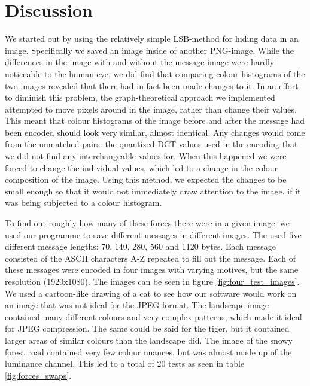 \section{Discussion}
We started out by using the relatively simple LSB-method for hiding data in an image.
Specifically we saved an image inside of another PNG-image.
While the differences in the image with and without the message-image were hardly noticeable to the human eye, we did find that comparing colour histograms of the two images revealed that there had in fact been made changes to it.
In an effort to diminish this problem, the graph-theoretical approach we implemented attempted to move pixels around in the image, rather than change their values.
This meant that colour histograms of the image before and after the message had been encoded should look very similar, almost identical.
Any changes would come from the unmatched pairs: the quantized DCT values used in the encoding that we did not find any interchangeable values for.
When this happened we were forced to change the individual values, which led to a change in the colour composition of the image.
Using this method, we expected the changes to be small enough so that it would not immediately draw attention to the image, if it was being subjected to a colour histogram.

To find out roughly how many of these forces there were in a given image, we used our programme to save different messages in different images.
The used five different message lengths: 70, 140, 280, 560 and 1120 bytes.
Each message consisted of the ASCII characters A-Z repeated to fill out the message.
Each of these messages were encoded in four images with varying motives, but the same resolution (1920x1080).
The images can be seen in figure \ref{fig:four_test_images}.
We used a cartoon-like drawing of a cat to see how our software would work on an image that was not ideal for the JPEG format.
The landscape image contained many different colours and very complex patterns, which made it ideal for JPEG compression.
The same could be said for the tiger, but it contained larger areas of similar colours than the landscape did.
The image of the snowy forest road contained very few colour nuances, but was almost made up of the luminance channel.
This led to a total of 20 tests as seen in table \ref{fig:forces_swaps}.

